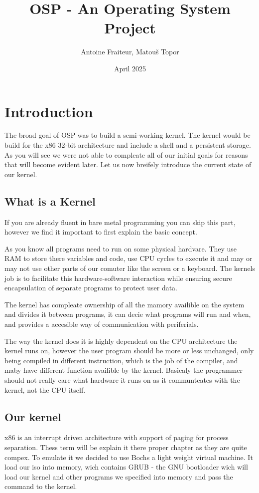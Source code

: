 \documentclass{article}
\title{OSP - An Operating System Project}
\author{Antoine Fraiteur, Matouš Topor}
\date{April 2025}
\begin{document}
\maketitle

\section{Introduction}

The broad goal of OSP was to build a semi-working kernel. The kernel would be build for the x86 32-bit architecture and include a shell and a persistent storage. As you will see we were not able to compleate all of our initial goals for reasons that will become evident later. Let us now breifely introduce the current state of our kernel.

\subsection{What is a Kernel}
If you are already fluent in bare metal programming you can skip this part, however we find it important to first explain the basic concept. 

As you know all programs need to run on some physical hardvare. They use RAM to store there variables and code, use CPU cycles to execute it and may or may not use other parts of our comuter like the screen or a keyboard. The kernels job is to facilitate this hardware-software interaction while ensuring secure encapsulation of separate programs to protect user data.

The kernel has compleate ownership of all the mamory availible on the system and divides it between programs, it can decie what programs will run and when, and provides a accesible way of communication with periferials.

The way the kernel does it is highly dependent on the CPU architecture the kernel runs on, however the user program should be more or less unchanged, only being compiled in different instruction, which is the job of the compiler, and maby have different function availible by the kernel. Basicaly the programmer should not really care what hardware it runs on as it communtcates with the kernel, not the CPU itself.  

\subsection{Our kernel}
x86 is an interrupt driven architecture with support of paging for process separation. Thess term will be explain it there proper chapter as they are quite compex. To emulate it we decided to use Bochs a light weight virtual machine. It load our iso into memory, wich contains GRUB - the GNU bootloader wich will load our kernel and other programs we specified into memory and pass the command to the kernel.
\end{document}
